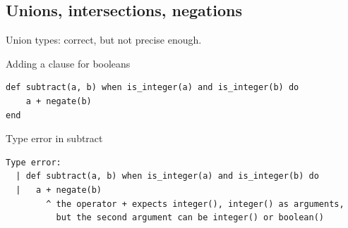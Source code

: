 \subsection{Unions, intersections, negations}

\begin{frame}[fragile]{Union types: correct, but not precise enough.}
\vspace{-2mm}
\begin{block}{Adding a clause for booleans}
\vspace{-2.1mm}
\vspace{-2.2mm}
\end{block}
\pause\pause

\vspace{-4mm}

\begin{block}{\vspace{-5mm}}
\vspace{-0.2mm}
\vspace{-2.1mm}
\begin{verbatim}
def subtract(a, b) when is_integer(a) and is_integer(b) do
    a + negate(b)
end
\end{verbatim}
\end{block}
\pause
\begin{block}{Type error in subtract}
\begin{verbatim}
Type error:
  | def subtract(a, b) when is_integer(a) and is_integer(b) do
  |   a + negate(b)
        ^ the operator + expects integer(), integer() as arguments,
          but the second argument can be integer() or boolean()
\end{verbatim}
\end{block}
\end{frame}

